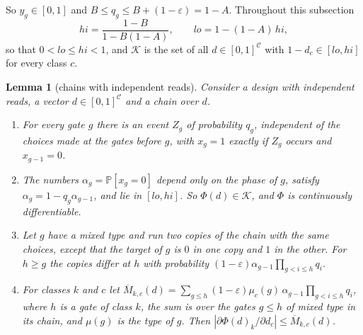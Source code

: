 \documentclass[11pt]{amsart}
\newtheorem{lemma}[theorem]{Lemma}
\theoremstyle{definition}
\theoremstyle{remark}
\newcommand{\eps}{\varepsilon}
\newcommand{\PP}{\mathbb{P}}
\begin{document}
\noindent So $y_g\in[0,1]$ and $B\le q_g\le B+(1-\eps)=1-A$. Throughout this subsection
\[
hi=\frac{1-B}{1-B(1-A)},\qquad lo=1-(1-A)\,hi,
\]
so that $0<lo\le hi<1$, and $\mathcal K$ is the set of all $d\in[0,1]^{\mathcal C}$ with $1-d_c\in[lo,hi]$
for every class $c$.

\begin{lemma}[chains with independent reads]\label{lem:onebit}
Consider a design with independent reads, a vector $d\in[0,1]^{\mathcal C}$ and a chain over $d$.
\begin{enumerate}[label=(\alph*),leftmargin=2.4em]
\item For every gate $g$ there is an event $Z_g$ of probability $q_g$, independent of the choices
made at the gates before $g$, with $x_g=1$ exactly if $Z_g$ occurs and $x_{g-1}=0$.
\item The numbers $\alpha_g=\PP[x_g=0]$ depend only on the phase of $g$, satisfy
$\alpha_g=1-q_g\alpha_{g-1}$, and lie in $[lo,hi]$. So $\Phi(d)\in\mathcal K$, and $\Phi$ is continuously
differentiable.
\item Let $g$ have a mixed type and run two copies of the chain with the same choices, except
that the target of $g$ is $0$ in one copy and $1$ in the other. For $h\ge g$ the copies differ at
$h$ with probability $(1-\eps)\alpha_{g-1}\prod_{g<i\le h}q_i$.
\item For classes $k$ and $c$ let
$\overline M_{k,c}(d)=\sum_{g\le h}(1-\eps)\mu_c(g)\,\alpha_{g-1}\prod_{g<i\le h}q_i$, where $h$ is
a gate of class $k$, the sum is over the gates $g\le h$ of mixed type in its chain, and $\mu(g)$ is
the type of $g$. Then $|\partial\Phi(d)_k/\partial d_c|\le\overline M_{k,c}(d)$.
\end{enumerate}
\end{lemma}
\end{document}
